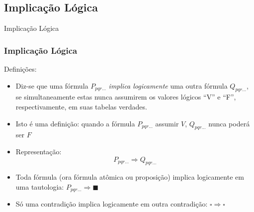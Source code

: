 
\subsection{Implicação Lógica}

\begin{frame}[t]
\vskip 3.5cm
\begin{center}
{\Huge Implicação Lógica}
\end{center}
\end{frame}

\begin{frame}[t]%

\frametitle{Implicação Lógica} %

\begin{block}{Definições:}
		\begin{itemize}
		
	\item Diz-se que uma fórmula $P_{pqr\ldots}$ {\em implica logicamente} uma outra fórmula $Q_{pqr\ldots}$, se simultaneamente estas 
	 nunca assumirem os valores lógicos ``V'' e ``F'', respectivamente, em suas tabelas verdades.
	 
	 \item Isto é uma definição: quando a fórmula  $P_{pqr\ldots}$ assumir $V$,
	 $Q_{pqr\ldots}$ nunca poderá ser $F$

	\item Representação: $$P_{pqr\ldots} \Rightarrow Q_{pqr\ldots}$$

	\item Toda fórmula (ora fórmula atômica ou proposição)  implica logicamente em 
	      uma tautologia: $P_{pqr\ldots} \Rightarrow\blacksquare$

	\item Só uma contradição implica logicamente em outra contradição: $\square \Rightarrow \square$
	
		
	\end{itemize}

	\end{block}
\end{frame}



